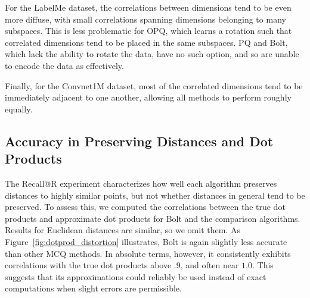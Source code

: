 For the LabelMe dataset, the correlations between dimensions tend to be even more diffuse, with small correlations spanning dimensions belonging to many subspaces. This is less problematic for OPQ, which learns a rotation such that correlated dimensions tend to be placed in the same subspaces. PQ and Bolt, which lack the ability to rotate the data, have no such option, and so are unable to encode the data as effectively.

Finally, for the Convnet1M dataset, most of the correlated dimensions tend to be immediately adjacent to one another, allowing all methods to perform roughly equally.

\vspace{-4mm}
\subsection{Accuracy in Preserving Distances and Dot Products}

\vspace{1mm}


The Recall@R experiment characterizes how well each algorithm preserves distances to highly similar points, but not whether distances in general tend to be preserved. To assess this, we computed the correlations between the true dot products and approximate dot products for Bolt and the comparison algorithms. Results for Euclidean distances are similar, so we omit them. As Figure~\ref{fig:dotprod_distortion} illustrates, Bolt is again slightly less accurate than other MCQ methods. In absolute terms, however, it consistently exhibits correlations with the true dot products above $.9$, and often near $1.0$. This suggests that its approximations could reliably be used instead of exact computations when slight errors are permissible.

